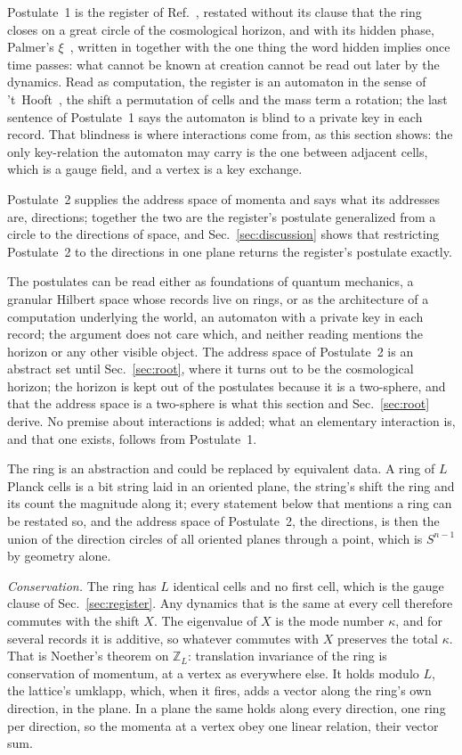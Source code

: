 \documentclass[aps,prd,twocolumn,superscriptaddress,nofootinbib]{revtex4-2}
\begin{document}
Postulate~1 is the register of Ref.~\cite{korytko2026c}, restated without its clause that the ring closes on a great circle of the cosmological horizon, and with its hidden phase, Palmer's $\xi$~\cite{palmer2026c}, written in together with the one thing the word hidden implies once time passes: what cannot be known at creation cannot be read out later by the dynamics. Read as computation, the register is an automaton in the sense of 't~Hooft~\cite{thooft2016}, the shift a permutation of cells and the mass term a rotation; the last sentence of Postulate~1 says the automaton is blind to a private key in each record. That blindness is where interactions come from, as this section shows: the only key-relation the automaton may carry is the one between adjacent cells, which is a gauge field, and a vertex is a key exchange.

Postulate~2 supplies the address space of momenta and says what its addresses are, directions; together the two are the register's postulate generalized from a circle to the directions of space, and Sec.~\ref{sec:discussion} shows that restricting Postulate~2 to the directions in one plane returns the register's postulate exactly.

The postulates can be read either as foundations of quantum mechanics, a granular Hilbert space whose records live on rings, or as the architecture of a computation underlying the world, an automaton with a private key in each record; the argument does not care which, and neither reading mentions the horizon or any other visible object. The address space of Postulate~2 is an abstract set until Sec.~\ref{sec:root}, where it turns out to be the cosmological horizon; the horizon is kept out of the postulates because it is a two-sphere, and that the address space is a two-sphere is what this section and Sec.~\ref{sec:root} derive. No premise about interactions is added; what an elementary interaction is, and that one exists, follows from Postulate~1.

The ring is an abstraction and could be replaced by equivalent data. A ring of $L$ Planck cells is a bit string laid in an oriented plane, the string's shift the ring and its count the magnitude along it; every statement below that mentions a ring can be restated so, and the address space of Postulate~2, the directions, is then the union of the direction circles of all oriented planes through a point, which is $S^{n-1}$ by geometry alone.

\textit{Conservation.} The ring has $L$ identical cells and no first cell, which is the gauge clause of Sec.~\ref{sec:register}. Any dynamics that is the same at every cell therefore commutes with the shift $X$. The eigenvalue of $X$ is the mode number $\kappa$, and for several records it is additive, so whatever commutes with $X$ preserves the total $\kappa$. That is Noether's theorem on $\mathbb{Z}_L$: translation invariance of the ring is conservation of momentum, at a vertex as everywhere else. It holds modulo $L$, the lattice's umklapp, which, when it fires, adds a vector along the ring's own direction, in the plane. In a plane the same holds along every direction, one ring per direction, so the momenta at a vertex obey one linear relation, their vector sum.
\end{document}
